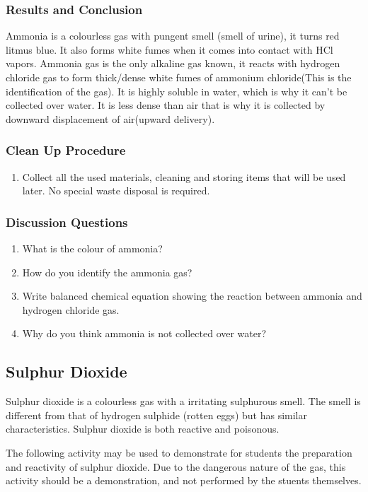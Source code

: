\subsubsection*{Results and Conclusion}
Ammonia is a colourless gas with pungent smell (smell of urine), it turns red litmus blue. It also forms white fumes when it comes into contact with HCl vapors.
Ammonia gas is the only alkaline gas known, it reacts with hydrogen chloride gas to form thick/dense white fumes of ammonium chloride(This is the identification of the gas). It is highly soluble in water, which is why it can't be collected over water. It is less dense than air that is why it is collected by downward displacement of air(upward delivery).

\subsubsection*{Clean Up Procedure}
\begin{enumerate}
\item{Collect all the used materials, cleaning and storing items that will be used later. No special waste disposal is required.}
\end{enumerate}

\subsubsection*{Discussion Questions}
\begin{enumerate}
\item{What is the colour of ammonia?}
\item{How do you identify the ammonia gas?}
\item{Write balanced chemical equation showing the reaction between ammonia and hydrogen chloride gas.}
\item{Why do you think ammonia is not collected over water?}
\end{enumerate}

\subsection{Sulphur Dioxide}

Sulphur dioxide is a colourless gas with a irritating sulphurous smell. The smell is different from that of hydrogen sulphide (rotten eggs) but has similar characteristics. Sulphur dioxide is both reactive and poisonous.

The following activity may be used to demonstrate for students the preparation and reactivity of sulphur dioxide. Due to the dangerous nature of the gas, this activity should be a demonstration, and not performed by the stuents themselves.

